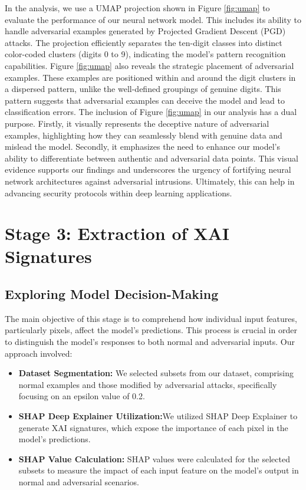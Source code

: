 \documentclass[10pt, conference, a4paper, final]{IEEEtran}
\begin{document}
In the analysis, we use a UMAP projection shown in Figure \ref{fig:umap} to evaluate the performance of our neural network model. This includes 
its ability to handle adversarial examples generated by Projected Gradient Descent (PGD) attacks. The projection efficiently separates the 
ten-digit classes into distinct color-coded clusters (digits 0 to 9), indicating the model's pattern recognition capabilities. 
Figure \ref{fig:umap} also reveals the strategic placement of adversarial examples. These examples are positioned within and around the 
digit clusters in a dispersed pattern, unlike the well-defined groupings of genuine digits. This pattern suggests that adversarial examples 
can deceive the model and lead to classification errors. The inclusion of Figure \ref{fig:umap} in our analysis has a dual purpose. Firstly, 
it visually represents the deceptive nature of adversarial examples, highlighting how they can seamlessly blend with genuine data and mislead 
the model. Secondly, it emphasizes the need to enhance our model's ability to differentiate between authentic and adversarial data points.
This visual evidence supports our findings and underscores the urgency of fortifying neural network architectures against adversarial intrusions.
 Ultimately, this can help in advancing security protocols within deep learning applications.




\section{Stage 3: Extraction of XAI Signatures}

\subsection{Exploring Model Decision-Making}
 The main objective of this stage is to comprehend how individual input features, particularly pixels, affect the model's predictions. 
 This process is crucial in order to distinguish the model's responses to both normal and adversarial inputs.
Our approach involved:
\begin{itemize}
    \item \textbf{Dataset Segmentation:} We selected subsets from our dataset, comprising normal examples and those modified by adversarial 
    attacks, specifically focusing on an epsilon value of 0.2.
    \item \textbf{SHAP Deep Explainer Utilization:}We utilized SHAP Deep Explainer to generate XAI signatures, which expose the importance 
    of each pixel in the model's predictions.

    \item \textbf{SHAP Value Calculation:} SHAP values were calculated for the selected subsets to measure the impact of each input feature 
    on the model's output in normal and adversarial scenarios.

\end{itemize}
\end{document}
